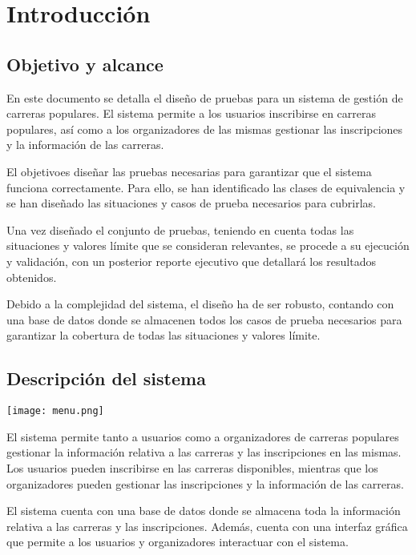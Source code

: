 \chapter{Introducción}
\section{Objetivo y alcance}
En este documento se detalla el diseño de pruebas para un sistema de gestión de carreras populares.
El sistema permite a los usuarios inscribirse en carreras populares, así como a los organizadores de
las mismas gestionar las inscripciones y la información de las carreras.

El objetivoes diseñar las pruebas necesarias para garantizar que el sistema funciona correctamente.
Para ello, se han identificado las clases de equivalencia y se han diseñado las situaciones y casos
de prueba necesarios para cubrirlas.

Una vez diseñado el conjunto de pruebas, teniendo en cuenta todas las situaciones y valores límite que se
consideran relevantes, se procede a su ejecución y validación, con un posterior reporte ejecutivo que
detallará los resultados obtenidos.

Debido a la complejidad del sistema, el diseño ha de ser robusto, contando con una base de datos donde
se almacenen todos los casos de prueba necesarios para garantizar la cobertura de todas las situaciones
y valores límite.

\section{Descripción del sistema}
\begin{minipage}{\linewidth}
	\centering
	\texttt{[image: menu.png]}
\end{minipage}

El sistema permite tanto a usuarios como a organizadores de carreras populares gestionar la información
relativa a las carreras y las inscripciones en las mismas. Los usuarios pueden inscribirse en las carreras
disponibles, mientras que los organizadores pueden gestionar las inscripciones y la información de las
carreras.

El sistema cuenta con una base de datos donde se almacena toda la información relativa a las carreras y
las inscripciones. Además, cuenta con una interfaz gráfica que permite a los usuarios y organizadores
interactuar con el sistema.
